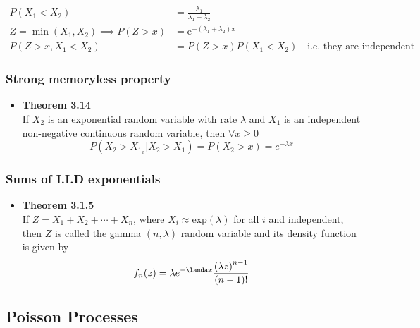 \documentclass[11pt,a4paper]{article}
\begin{document}
\begin{align*}{}
    P(X_1 < X_2) &= \frac{\lambda_1}{\lambda_1 + \lambda_2} \\
    Z = \min(X_1, X_2) \implies
    P(Z>x) &= \mathrm{e}^{-(\lambda_1 + \lambda_2)x} \\
    P(Z > x, X_1 < X_2) &= P(Z>x) P(X_1 < X_2) \quad \text{i.e.\ they are independent}
\end{align*}

\subsubsection{Strong memoryless property}

\begin{itemize}

    \item \textbf{Theorem 3.14} \\
        If $X_2$ is an exponential random variable with rate $\lambda$ and $X_1$
        is an independent non-negative continuous random variable, then $\forall x \geq 0$
        \[
            P(X_2 > X_1 _ x | X_2 > X_1) = P(X_2 > x) = e^{-\lambda x}
        \]

\end{itemize}

\subsubsection{Sums of I.I.D exponentials}

\begin{itemize}

    \item \textbf{Theorem 3.1.5} \\
        If $Z = X_1 + X_2 + \cdots + X_n$, where $X_i \approx \text{exp}(\lambda)$ for all $i$
        and independent, then $Z$ is called the gamma $(n, \lambda)$ random variable and its
        density function is given by
        \[
            f_n(z) = \lambda e^{-\lamda x} \frac{{(\lambda z)}^{n-1}}{(n-1)!}
        \]

\end{itemize}

\subsection{Poisson Processes}
\end{document}
